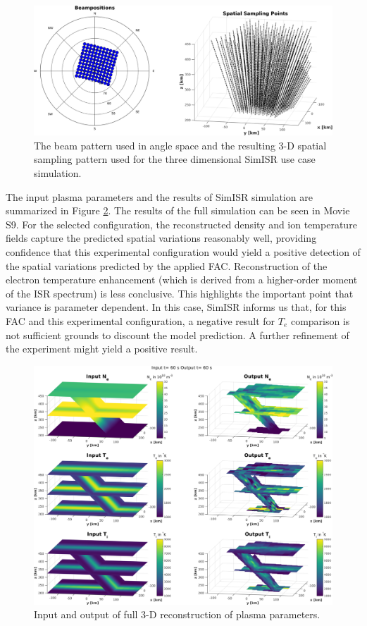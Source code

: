 \documentclass[draft,ras]{agutex}
\begin{document}
\begin{article}
\begin{figure}[!t]
\centering
\includegraphics[width=6in]{Sampling3d}
\caption{The beam pattern used in angle space and the resulting 3-D spatial sampling pattern used for the three dimensional SimISR use case simulation.}
\label{fig:3dsampling}
\end{figure}

The input plasma parameters and the results of SimISR simulation are summarized in Figure \ref{fig:3dparams}. The results of the full simulation can be seen in Movie S9. For the selected configuration, the reconstructed density and ion temperature fields capture the predicted spatial variations reasonably well, providing confidence that this experimental configuration would yield a positive detection of the spatial variations predicted by the applied FAC.  Reconstruction of the electron temperature enhancement (which is derived from a higher-order moment of the ISR spectrum) is less conclusive. This highlights the important point that variance is parameter dependent. In this case, SimISR informs us that, for this FAC and this experimental configuration, a negative result for $T_e$ comparison is not sufficient grounds to discount the model prediction.  A further refinement of the experiment might yield a positive result.
\begin{figure}[!t]
\centering
\includegraphics[width=6in]{60_60}
\caption{Input and output of full 3-D reconstruction of plasma parameters.}
\label{fig:3dparams}
\end{figure}


\end{article}
\end{document}
